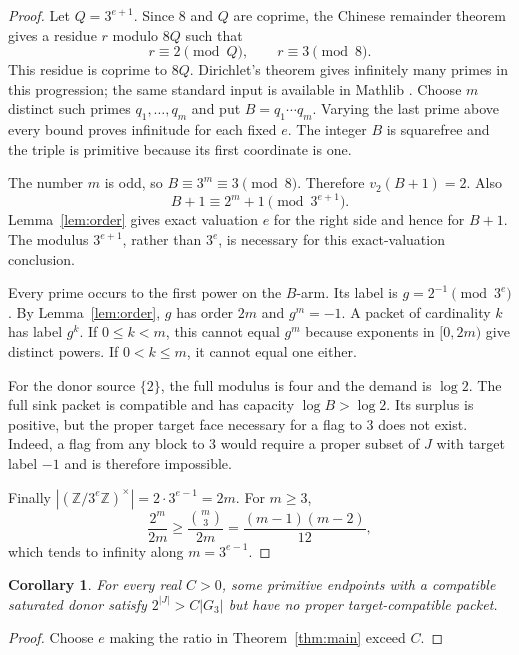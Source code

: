 \documentclass[11pt,a4paper]{article}
\newtheorem{corollary}[theorem]{Corollary}
\theoremstyle{definition}
\theoremstyle{remark}
\newcommand{\Z}{\mathbb Z}
\begin{document}
\begin{proof}
Let $Q=3^{e+1}$. Since $8$ and $Q$ are coprime, the Chinese remainder theorem
gives a residue $r$ modulo $8Q$ such that
\begin{equation}\label{eq:crt}
 r\equiv2\pmod Q,\qquad r\equiv3\pmod8.
\end{equation}
This residue is coprime to $8Q$. Dirichlet's theorem gives infinitely many
primes in this progression; the same standard input is available in
Mathlib \cite{dirichlet}. Choose $m$ distinct such primes $q_1,\ldots,q_m$
and put $B=q_1\cdots q_m$. Varying the last prime above every bound proves
infinitude for each fixed $e$. The integer $B$ is squarefree and the triple
is primitive because its first coordinate is one.

The number $m$ is odd, so $B\equiv3^m\equiv3\pmod8$. Therefore
$v_2(B+1)=2$. Also
\[
 B+1\equiv2^m+1\pmod{3^{e+1}}.
\]
Lemma~\ref{lem:order} gives exact valuation $e$ for the right side and hence
for $B+1$. The modulus $3^{e+1}$, rather than $3^e$, is necessary for this
exact-valuation conclusion.

Every prime occurs to the first power on the $B$-arm. Its label is
$g=2^{-1}\pmod{3^e}$. By Lemma~\ref{lem:order}, $g$ has order $2m$ and
$g^m=-1$. A packet of cardinality $k$ has label $g^k$. If $0\le k<m$, this
cannot equal $g^m$ because exponents in $[0,2m)$ give distinct powers.
If $0<k\le m$, it cannot equal one either.

For the donor source $\{2\}$, the full modulus is four and the demand is
$\log2$. The full sink packet is compatible and has capacity $\log B>\log2$.
Its surplus is positive, but the proper target face necessary for a flag to
$3$ does not exist. Indeed, a flag from any block to $3$ would require a
proper subset of $J$ with target label $-1$ and is therefore impossible.

Finally $|(\Z/3^e\Z)^\times|=2\cdot3^{e-1}=2m$. For $m\ge3$,
\[
 \frac{2^m}{2m}\ge\frac{\binom m3}{2m}
 =\frac{(m-1)(m-2)}{12},
\]
which tends to infinity along $m=3^{e-1}$.
\end{proof}

\begin{corollary}\label{cor:constant}
For every real $C>0$, some primitive endpoints with a compatible saturated
donor satisfy $2^{|J|}>C|G_3|$ but have no proper target-compatible packet.
\end{corollary}
\begin{proof}
Choose $e$ making the ratio in Theorem~\ref{thm:main} exceed $C$.
\end{proof}
\end{document}
